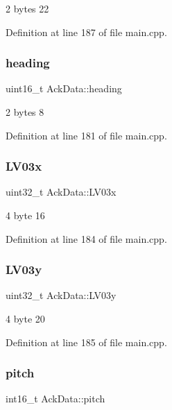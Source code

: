 2 bytes 22 



Definition at line 187 of file main.\+cpp.

\mbox{\label{structAckData_a66b0ebcdeb3e0e59bcef03b1d4016950}} 
\subsubsection{\texorpdfstring{heading}{heading}}
{\footnotesize\ttfamily uint16\+\_\+t Ack\+Data\+::heading}



2 bytes 8 



Definition at line 181 of file main.\+cpp.

\mbox{\label{structAckData_a954849d2888715136c6e5cc2e9808ad5}} 
\subsubsection{\texorpdfstring{LV03x}{LV03x}}
{\footnotesize\ttfamily uint32\+\_\+t Ack\+Data\+::\+L\+V03x}



4 byte 16 



Definition at line 184 of file main.\+cpp.

\mbox{\label{structAckData_a1111544b84d5ecfa27f168d988e28b8f}} 
\subsubsection{\texorpdfstring{LV03y}{LV03y}}
{\footnotesize\ttfamily uint32\+\_\+t Ack\+Data\+::\+L\+V03y}



4 byte 20 



Definition at line 185 of file main.\+cpp.

\mbox{\label{structAckData_a1bbf988ac7e1bf34f0d932c5cfa10740}} 
\subsubsection{\texorpdfstring{pitch}{pitch}}
{\footnotesize\ttfamily int16\+\_\+t Ack\+Data\+::pitch}



